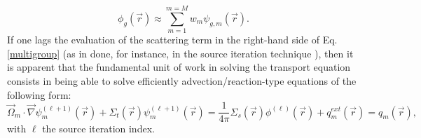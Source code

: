 \documentclass[times,final]{elsarticle}
\newcommand{\vr}{\vec{r}}
\newcommand{\vo}{\vec{\Omega}}
\begin{document}
\begin{equation}
\label{def_scalar_flux_2}
\phi_g(\vr) \approx \sum_{m=1}^{m=M} w_m \psi_{g,m}(\vr).
\end{equation}
If one lags the evaluation of the scattering term in the right-hand side of Eq.\eqref{multigroup} (as in done, for instance, in the source iteration technique \cite{SI}), then it is apparent that the fundamental unit of work in solving the transport equation consists in being able to solve efficiently advection/reaction-type equations of the following form:
\begin{equation}
\vo_m \cdot \vec \nabla \psi_{m}^{(\ell+1)}(\vr) +\Sigma_{t}(\vr) \psi_{m}^{(\ell+1)}(\vr)  = \frac{1}{4\pi}\Sigma_{s}(\vr)\phi^{(\ell)}(\vr) + q^{ext}_m(\vr) = q_m(\vr),
\label{eq:one-group-transport}
\end{equation}
with $\ell$ the source iteration index.
\end{document}
